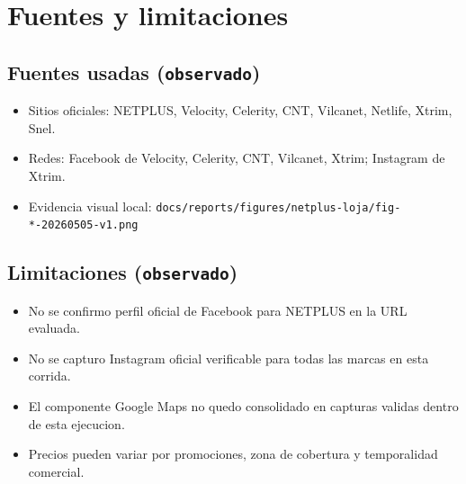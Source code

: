 \documentclass[9pt,a4paper,twocolumn,twoside]{tau-class/tau}
\begin{document}
\section{Fuentes y limitaciones}
\subsection{Fuentes usadas (\texttt{observado})}
\begin{itemize}
  \item Sitios oficiales: NETPLUS, Velocity, Celerity, CNT, Vilcanet, Netlife, Xtrim, Snel.
  \item Redes: Facebook de Velocity, Celerity, CNT, Vilcanet, Xtrim; Instagram de Xtrim.
  \item Evidencia visual local: \texttt{docs/reports/figures/netplus-loja/fig-*-20260505-v1.png}
\end{itemize}

\subsection{Limitaciones (\texttt{observado})}
\begin{itemize}
  \item No se confirmo perfil oficial de Facebook para NETPLUS en la URL evaluada.
  \item No se capturo Instagram oficial verificable para todas las marcas en esta corrida.
  \item El componente Google Maps no quedo consolidado en capturas validas dentro de esta ejecucion.
  \item Precios pueden variar por promociones, zona de cobertura y temporalidad comercial.
\end{itemize}
\end{document}
